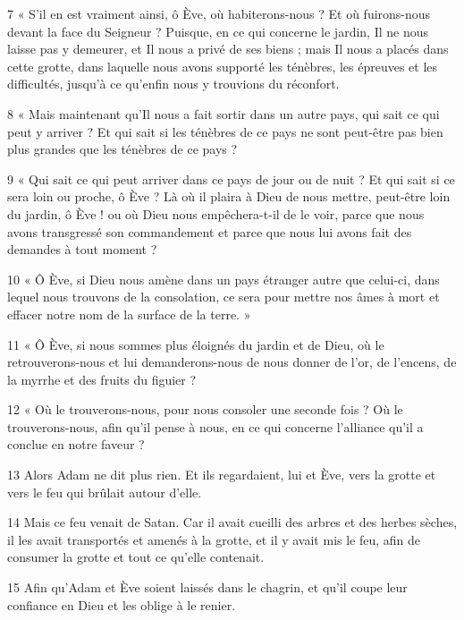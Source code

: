 \par 7 « S'il en est vraiment ainsi, ô Ève, où habiterons-nous ? Et où fuirons-nous devant la face du Seigneur ? Puisque, en ce qui concerne le jardin, Il ne nous laisse pas y demeurer, et Il nous a privé de ses biens ; mais Il nous a placés dans cette grotte, dans laquelle nous avons supporté les ténèbres, les épreuves et les difficultés, jusqu'à ce qu'enfin nous y trouvions du réconfort.

\par 8 « Mais maintenant qu'Il nous a fait sortir dans un autre pays, qui sait ce qui peut y arriver ? Et qui sait si les ténèbres de ce pays ne sont peut-être pas bien plus grandes que les ténèbres de ce pays ?

\par 9 « Qui sait ce qui peut arriver dans ce pays de jour ou de nuit ? Et qui sait si ce sera loin ou proche, ô Ève ? Là où il plaira à Dieu de nous mettre, peut-être loin du jardin, ô Ève ! ou où Dieu nous empêchera-t-il de le voir, parce que nous avons transgressé son commandement et parce que nous lui avons fait des demandes à tout moment ?

\par 10 « Ô Ève, si Dieu nous amène dans un pays étranger autre que celui-ci, dans lequel nous trouvons de la consolation, ce sera pour mettre nos âmes à mort et effacer notre nom de la surface de la terre. »

\par 11 « Ô Ève, si nous sommes plus éloignés du jardin et de Dieu, où le retrouverons-nous et lui demanderons-nous de nous donner de l'or, de l'encens, de la myrrhe et des fruits du figuier ?

\par 12 « Où le trouverons-nous, pour nous consoler une seconde fois ? Où le trouverons-nous, afin qu'il pense à nous, en ce qui concerne l'alliance qu'il a conclue en notre faveur ?

\par 13 Alors Adam ne dit plus rien. Et ils regardaient, lui et Ève, vers la grotte et vers le feu qui brûlait autour d'elle.

\par 14 Mais ce feu venait de Satan. Car il avait cueilli des arbres et des herbes sèches, il les avait transportés et amenés à la grotte, et il y avait mis le feu, afin de consumer la grotte et tout ce qu'elle contenait.

\par 15 Afin qu'Adam et Ève soient laissés dans le chagrin, et qu'il coupe leur confiance en Dieu et les oblige à le renier.

